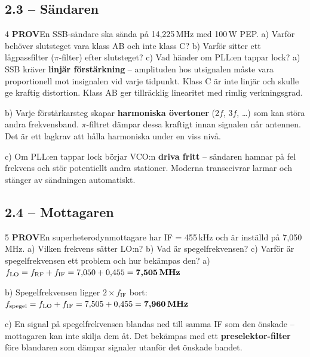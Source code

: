 \documentclass[a4paper,11pt,twoside]{book}
\newcommand{\qprov}{\colorbox{redpale}{\textcolor{reddark}{\headingfont\bfseries\tiny PROV}}}
\begin{document}
\subsection*{2.3 – Sändaren}

\begin{facitblock}{4}
\qprov\quad En SSB-sändare ska sända på 14,225\,MHz med 100\,W PEP.
a) Varför behöver slutsteget vara klass AB och inte klass C?
b) Varför sitter ett lågpassfilter ($\pi$-filter) efter slutsteget?
c) Vad händer om PLL:en tappar lock?
\tcblower
a) SSB kräver \textbf{linjär förstärkning} -- amplituden hos
utsignalen måste vara proportionell mot insignalen vid varje
tidpunkt. Klass C är inte linjär och skulle ge kraftig distortion.
Klass AB ger tillräcklig linearitet med rimlig verkningsgrad.

b) Varje förstärkarsteg skapar \textbf{harmoniska övertoner}
(2$f$, 3$f$, \ldots) som kan störa andra frekvensband.
$\pi$-filtret dämpar dessa kraftigt innan signalen når antennen.
Det är ett lagkrav att hålla harmoniska under en viss nivå.

c) Om PLL:en tappar lock börjar VCO:n \textbf{driva fritt} --
sändaren hamnar på fel frekvens och stör potentiellt andra
stationer. Moderna transceivrar larmar och stänger av sändningen
automatiskt.
\end{facitblock}

\subsection*{2.4 – Mottagaren}

\begin{facitblock}{5}
\qprov\quad En superheterodynmottagare har IF = 455\,kHz och
är inställd på 7,050\,MHz.
a) Vilken frekvens sätter LO:n?
b) Vad är spegelfrekvensen?
c) Varför är spegelfrekvensen ett problem och hur bekämpas den?
\tcblower
a) $f_{\text{LO}} = f_{\text{RF}} + f_{\text{IF}}
= 7{,}050 + 0{,}455 = \textbf{7{,}505\,MHz}$

b) Spegelfrekvensen ligger $2 \times f_{\text{IF}}$ bort:
$f_{\text{spegel}} = f_{\text{LO}} + f_{\text{IF}}
= 7{,}505 + 0{,}455 = \textbf{7{,}960\,MHz}$

c) En signal på spegelfrekvensen blandas ned till samma IF som
den önskade -- mottagaren kan inte skilja dem åt. Det bekämpas
med ett \textbf{preselektor-filter} före blandaren som dämpar
signaler utanför det önskade bandet.
\end{facitblock}
\end{document}
